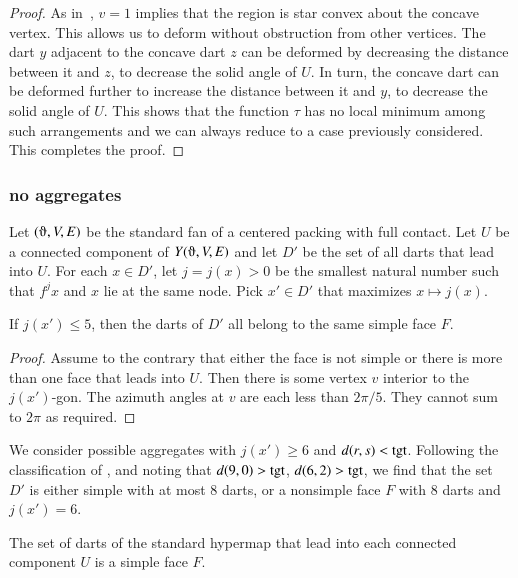 \begin{proof}
As in~\cite{Hales:2006:DCG}, $v=1$ implies that the region is star convex about the concave vertex.  This allows us to deform without obstruction from other vertices.  The dart $y$ adjacent to the concave dart $z$ can be deformed by decreasing the distance between it and $z$, to decrease the solid angle of $U$.  In turn, the concave dart can be deformed further to increase the distance between it and $y$, to decrease the solid angle of $U$.  This shows that the function $\tau$ has no local minimum among such arrangements and we can always reduce to a case previously considered.  This completes the proof.
\end{proof}

\subsubsection{no aggregates}

Let $(\orgn,V,E)$ be the standard fan of a centered packing with full contact.  Let $U$ be a connected component of $Y(\orgn,V,E)$ and let $D'$ be the set of all darts that lead into $U$.  For each $x\in D'$, let $j = j(x) >0$ be the smallest natural number such that $f^j x$ and $x$ lie at the same node.  Pick $x'\in D'$ that maximizes $x\mapsto j(x)$.  

\begin{lemma}\label{lemma:DU}  If $j(x')\le 5$, then the darts of $D'$ all belong to the same simple face $F$.
\end{lemma}

\begin{proof} Assume to the contrary that either the face is not simple or there is more than one face that leads into $U$.  Then there is some vertex $v$ interior to the $j(x')$-gon.  The azimuth angles at $v$ are each less than $2\pi/5$. They cannot sum to $2\pi$ as required.
\end{proof}

We consider possible aggregates with $j(x')\ge 6$ and $d(r,s)<{\operatorname{tgt}}$.
Following the classification of \cite[p.~126,~Fig.~12.1]{Hales:2006:DCG}, and noting that $d(9,0) > {\operatorname{tgt}}$, $d(6,2) > {\operatorname{tgt}}$, we find that the set $D'$
is either simple with at most $8$ darts, or a nonsimple face $F$ with $8$ darts and $j(x')=6$.

\begin{lemma}\label{lemma:simple} The set of darts of the standard hypermap that lead into each connected component $U$ is a simple face $F$.
\end{lemma}

